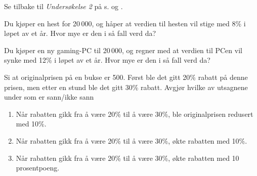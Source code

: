 Se tilbake til \textsl{Undersøkelse 2} på s. \pageref{undersok} og \pageref{sektorund2}. 

 \vs
{}

 \vs
{}
Du kjøper en hest for 20\,000, og håper at verdien til hesten vil stige med 8\% i løpet av et år. Hvor mye er den i så fall verd da?

Du kjøper en ny gaming-PC til 20\,000, og regner med at verdien til PCen vil synke med 12\% i løpet av et år. Hvor mye er den i så fall verd da?

Si at originalprisen på en bukse er 500. Først ble det gitt 20\% rabatt på denne prisen, men etter en stund ble det gitt 30\% rabatt. Avgjør hvilke av utsagnene under som er sann/ikke sann
\begin{enumerate}[label=(\roman*)]
	\item Når rabatten gikk fra å være 20\% til å være 30\%, ble originalprisen redusert med 10\%.
	\item Når rabatten gikk fra å være 20\% til å være 30\%, økte rabatten med 10\%.
	\item Når rabatten gikk fra å være 20\% til å være 30\%, økte rabatten med 10 prosentpoeng.	
\end{enumerate}

\nes

 \vs
{}

